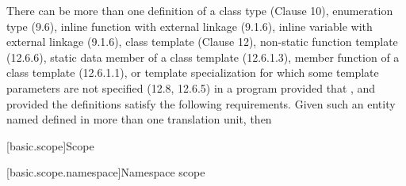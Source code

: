 \begin{std.txt}
  \pnum[12]
  There can be more than one definition of a class type (Clause 10),
  enumeration type (9.6), inline function with external
  linkage (9.1.6),
  inline variable with external linkage (9.1.6),
  class template (Clause 12),
  non-static function template (12.6.6),
  static data member of a class
  template (12.6.1.3), member function of a class template (12.6.1.1), or
  template specialization for which some template parameters are not
  specified (12.8, 12.6.5) in a program provided that
  ,
  and provided the definitions satisfy the
  following requirements.
  Given such an entity named  defined in more than one
  translation unit, then
\end{std.txt}

[basic.scope]{Scope}%

\setcounter{subsection}{5}
[basic.scope.namespace]{Namespace scope}

